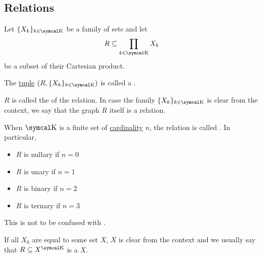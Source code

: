 \subsection{Relations}\label{subsec:relations}

\begin{definition}\label{def:relation}
  Let \( \{ X_k \}_{k \in \CK} \) be a family of sets and let
  \begin{equation*}
    R \subseteq \prod_{k \in \CK} X_k
  \end{equation*}
  be a subset of their Cartesian product.

  The \hyperref[def:cartesian_product]{tuple} \( (R,  \{ X_k \}_{k \in \CK}) \) is called a .

  \begin{DefEnum}
     \( R \) is called the  of the relation. In case the family \( \{ X_k \}_{k \in \CK} \) is clear from the context, we say that the graph \( R \) itself is a relation.

     When \( \CK \) is a finite set of \hyperref[rem:cardinals]{cardinality} \( n \), the relation is called . In particular,
    \begin{itemize}
      \item \( R \) is nullary if \( n = 0 \)
      \item \( R \) is unary if \( n = 1 \)
      \item \( R \) is binary if \( n = 2 \)
      \item \( R \) is ternary if \( n = 3 \)
    \end{itemize}

    This is not to be confused with .

     If all \( X_k \) are equal to some set \( X \), \( X \) is clear from the context and we usually say that \( R \subseteq X^{\CK} \) is a  \( X \).
  \end{DefEnum}
\end{definition}

